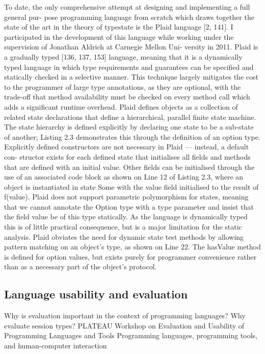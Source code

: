 To date, the only comprehensive attempt at designing and implementing a full general pur- pose programming language from scratch which draws together the state of the art in the theory of typestate is the Plaid language [2, 141]. I participated in the development of this language while working under the supervision of Jonathan Aldrich at Carnegie Mellon Uni- versity in 2011.
Plaid is a gradually typed [136, 137, 153] language, meaning that it is a dynamically typed language in which type requirements and guarantees can be specified and statically checked in a selective manner. This technique largely mitigates the cost to the programmer of large type annotations, as they are optional, with the trade-off that method availability must be checked on every method call which adds a significant runtime overhead.
Plaid defines objects as a collection of related state declarations that define a hierarchical, parallel finite state machine. The state hierarchy is defined explicitly by declaring one state to be a sub-state of another; Listing 2.3 demonstrates this through the definition of an option type. Explicitly defined constructors are not necessary in Plaid — instead, a default con- structor exists for each defined state that initialises all fields and methods that are defined with an initial value. Other fields can be initialised through the use of an associated code block as shown on Line 12 of Listing 2.3, where an object is instantiated in state Some with the value field initialised to the result of f(value).
Plaid does not support parametric polymorphism for states, meaning that we cannot annotate the Option type with a type parameter and insist that the field value be of this type statically. As the language is dynamically typed this is of little practical consequence, but is a major limitation for the static analysis.
Plaid obviates the need for dynamic state test methods by allowing pattern matching on an object’s type, as shown on Line 22. The hasValue method is defined for option values, but exists purely for programmer convenience rather than as a necessary part of the object’s protocol.

\subsection{Language usability and evaluation}
\label{sub: evaluation}
Why is evaluation important in the context of programming languages?
Why evaluate session types?
PLATEAU Workshop on Evaluation and Usability of Programming Languages and Tools
Programming languages, programming tools, and human-computer interaction
